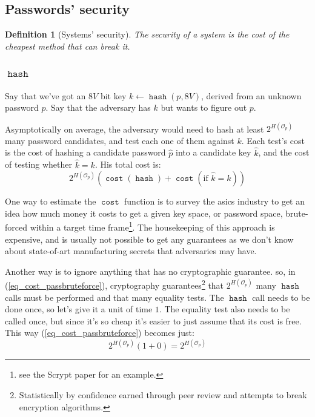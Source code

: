 \documentclass[twocolumn]{article}
\newtheorem{definition}{Definition}[section]
\DeclareMathOperator{\hash}{\mathtt{hash}}
\DeclareMathOperator{\cost}{\mathtt{cost}}
\begin{document}
\subsection{Passwords' security}
\begin{definition}[Systems' security]\label{def_system_security}
The security of a system is the cost of the cheapest method that can break
it.
\end{definition}

\subsubsection{$\hash$}
Say that we've got an $8V$ bit key $k \gets \hash(p, 8V)$, derived from an
unknown password $p$.  Say that the adversary has $k$ but wants to figure
out $p$.

Asymptotically on average, the adversary would need to hash at least
$2^{H(\mathcal{O}_p)}$ many password candidates, and test each one of them
against $k$.  Each test's cost is the cost of hashing a candidate password
$\hat p$ into a candidate key $\hat k$, and the cost of testing whether
$\hat k = k$.  His total cost is:
\begin{equation}\label{eq_cost_passbruteforce}
    2^{H(\mathcal{O}_p)} \left(
        \cost(\hash) + \cost(\text{if } \hat k = k)
    \right)
\end{equation}

One way to estimate the $\cost$ function is to survey the \glspl{asic}
industry to get an idea how much money it costs to get a given key space,
or password space, brute-forced within a target time frame\footnote{see the
Scrypt paper for an example.}.  The housekeeping of this approach is
expensive, and is usually not possible to get any guarantees as we don't
know about state-of-art manufacturing secrets that adversaries may have.

Another way is to ignore anything that has no cryptographic guarantee.  so,
in (\ref{eq_cost_passbruteforce}), cryptography
guarantees\footnote{Statistically by confidence earned through peer review
and attempts to break encryption algorithms.} that $2^{H(\mathcal{O}_p)}$
many $\hash$ calls must be performed and that many equality tests.  The
$\hash$ call needs to be done once, so let's give it a unit of time $1$.
The equality test also needs to be called once, but since it's so cheap
it's easier to just assume that its cost is free.  This way
(\ref{eq_cost_passbruteforce}) becomes just:
\begin{equation}\label{eq_simplecost_passbruteforce}
    2^{H(\mathcal{O}_p)} (1+0) = 2^{H(\mathcal{O}_p)}
\end{equation}
\end{document}
